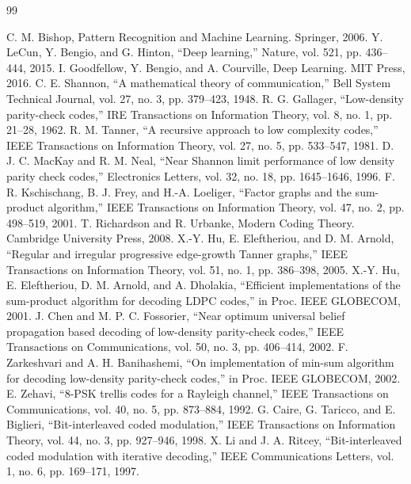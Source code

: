 \begin{thebibliography}{99}
 C. M. Bishop, Pattern Recognition and Machine Learning. Springer, 2006.
 Y. LeCun, Y. Bengio, and G. Hinton, ``Deep learning,'' Nature, vol. 521, pp. 436--444, 2015.
 I. Goodfellow, Y. Bengio, and A. Courville, Deep Learning. MIT Press, 2016.
 C. E. Shannon, ``A mathematical theory of communication,'' Bell System Technical Journal, vol. 27, no. 3, pp. 379--423, 1948.
 R. G. Gallager, ``Low-density parity-check codes,'' IRE Transactions on Information Theory, vol. 8, no. 1, pp. 21--28, 1962.
 R. M. Tanner, ``A recursive approach to low complexity codes,'' IEEE Transactions on Information Theory, vol. 27, no. 5, pp. 533--547, 1981.
 D. J. C. MacKay and R. M. Neal, ``Near Shannon limit performance of low density parity check codes,'' Electronics Letters, vol. 32, no. 18, pp. 1645--1646, 1996.
 F. R. Kschischang, B. J. Frey, and H.-A. Loeliger, ``Factor graphs and the sum-product algorithm,'' IEEE Transactions on Information Theory, vol. 47, no. 2, pp. 498--519, 2001.
 T. Richardson and R. Urbanke, Modern Coding Theory. Cambridge University Press, 2008.
 X.-Y. Hu, E. Eleftheriou, and D. M. Arnold, ``Regular and irregular progressive edge-growth Tanner graphs,'' IEEE Transactions on Information Theory, vol. 51, no. 1, pp. 386--398, 2005.
 X.-Y. Hu, E. Eleftheriou, D. M. Arnold, and A. Dholakia, ``Efficient implementations of the sum-product algorithm for decoding LDPC codes,'' in Proc. IEEE GLOBECOM, 2001.
 J. Chen and M. P. C. Fossorier, ``Near optimum universal belief propagation based decoding of low-density parity-check codes,'' IEEE Transactions on Communications, vol. 50, no. 3, pp. 406--414, 2002.
 F. Zarkeshvari and A. H. Banihashemi, ``On implementation of min-sum algorithm for decoding low-density parity-check codes,'' in Proc. IEEE GLOBECOM, 2002.
 E. Zehavi, ``8-PSK trellis codes for a Rayleigh channel,'' IEEE Transactions on Communications, vol. 40, no. 5, pp. 873--884, 1992.
 G. Caire, G. Taricco, and E. Biglieri, ``Bit-interleaved coded modulation,'' IEEE Transactions on Information Theory, vol. 44, no. 3, pp. 927--946, 1998.
 X. Li and J. A. Ritcey, ``Bit-interleaved coded modulation with iterative decoding,'' IEEE Communications Letters, vol. 1, no. 6, pp. 169--171, 1997.

\end{thebibliography}
